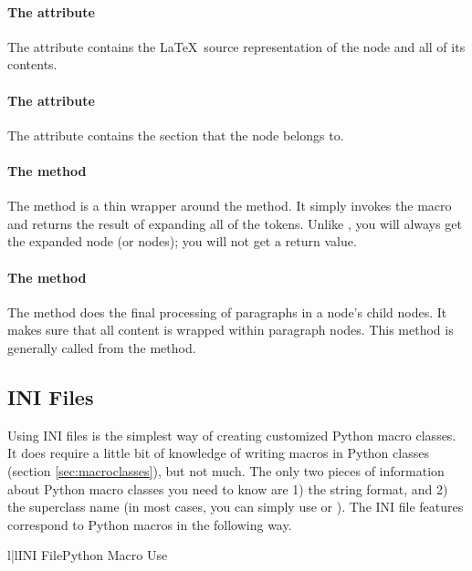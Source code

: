 \paragraph{The  attribute}
The  attribute contains the \LaTeX\ source representation
of the node and all of its contents.

\paragraph{The  attribute}
The  attribute contains the section that the
node belongs to.

\paragraph{The  method}
The  method is a thin wrapper around the 
method.  It simply invokes the macro and returns the result of 
expanding all of the tokens.  Unlike , you will 
always get the expanded node (or nodes); you will not get a 
return value.

\paragraph{The  method}
The  method does the final processing of paragraphs
in a node's child nodes.  It makes sure that all content is wrapped
within paragraph nodes.  This method is generally called from the
 method.


\subsection{INI Files\label{sec:inimacros}}

Using INI files is the simplest way of creating customized Python macro
classes.  It does require a little bit of knowledge of writing 
macros in Python classes (section \ref{sec:macroclasses}), but not 
much.  The only two pieces of information about Python macro classes
you need to know are 1) the  string format, and 2)
the superclass name (in most cases, you can simply use 
or ).  The INI file features correspond to Python
macros in the following way.
\begin{tableii}{l|l}{}{INI File}{Python Macro Use}
\end{tableii}

